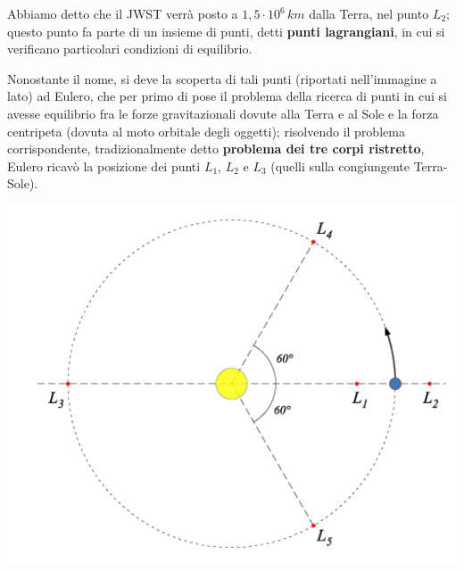 \clearpage

Abbiamo detto che il JWST verrà posto a $1,5 \cdot 10^6 \, km$ dalla Terra, nel punto $L_2$; questo punto fa parte di un insieme di punti, detti \textbf{punti lagrangiani}, in cui si verificano particolari condizioni di equilibrio.
\vspace{0.05cm}
\\
\begin{minipage}{.55\textwidth}
Nonostante il nome, si deve la scoperta di tali punti (riportati nell'immagine a lato) ad Eulero, che per primo di pose il problema della ricerca di punti in cui si avesse equilibrio fra le forze gravitazionali dovute alla Terra e al Sole e la forza centripeta (dovuta al moto orbitale degli oggetti); risolvendo il problema corrispondente, tradizionalmente detto \textbf{problema dei tre corpi ristretto}, Eulero ricavò la posizione dei punti $L_1$, $L_2$ e $L_3$ (quelli sulla congiungente Terra-Sole).
\end{minipage}
\begin{minipage}{.40\textwidth}
	\centering
	\includegraphics[width=1\textwidth]{Img/pti_lagrangiani_bis.png}
\end{minipage}
\vspace{0.1cm}
\\
